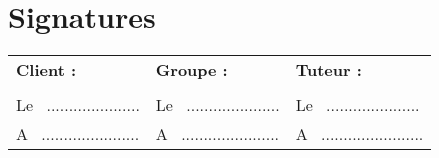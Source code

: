 \documentclass[12pt,a4paper,openany]{article}
\begin{document}
\section*{Signatures}
\vspace{20px}
\begin{tabular}[center]{p{175px}p{175px}p{175px}}
  \textbf{Client :} & \textbf{Groupe :} & \textbf{Tuteur :} \\
  \\
  Le ~..................... & Le ~..................... & Le ~..................... \\
  A ~...................... & A ~...................... & A ~....................... \\
\end{tabular}
\end{document}
